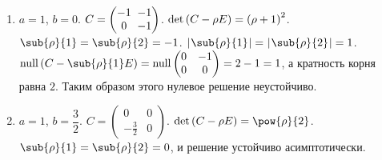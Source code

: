\documentclass[a5paper,10pt]{article}
\begin{document}
\begin{enumerate}[label={\asbuk*})]
    \item $a = 1$, $b = 0$. 
    $C = \begin{pmatrix} -1 & \negthickspace\!-1 \\ 0 & \negthickspace\!-1 \end{pmatrix}$.
    $\det\left(\hspace{0.01em}C - \rho E\hspace{0.01em}\right) = \left(\hspace{0.01em}\rho + 1\hspace{0.01em}\right)^2$.
    $\sub{\rho}{1} = \sub{\rho}{2} = -1$.
    $\vbr{\sub{\rho}{1}} = \vbr{\sub{\rho}{2}} = 1$.
    $\nullity\br{C - \sub{\rho}{1} E} = \nullity \begin{pmatrix}0 & -1 \\ 0 & 0 \end{pmatrix} = 2 - 1 = 1$,
    а кратность корня равна $2$. Таким образом этого нулевое решение неустойчиво.
    
    \item $a = 1$, $b = \dfrac {3} {2}$.
    $C = \begin{pmatrix} 0 & 0 \\ -\frac {3} {2} & 0 \end{pmatrix}$.
    $\det\br{C - \rho E} = \pow{\rho}{2}$. $\sub{\rho}{1} = \sub{\rho}{2} = 0$,
    и решение устойчиво асимптотически.
\end{enumerate}
\end{document}
